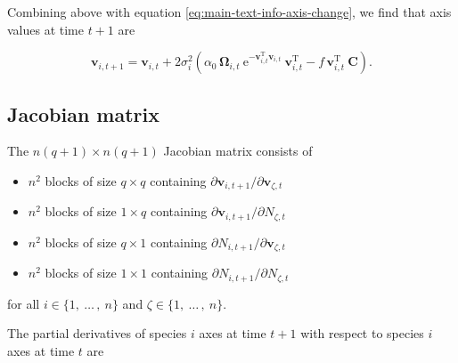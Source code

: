 Combining above with equation \ref{eq:main-text-info-axis-change}, we find that axis values at
time $t+1$ are

\begin{equation} \label{eq:supp-axis-change-full}
    \mathbf{v}_{i,t+1} = \mathbf{v}_{i,t} + 2 \sigma_i^2
    \left(
        \alpha_0 \, \mathbf{\Omega}_{i,t} \:
            \textrm{e}^{- \mathbf{v}_{i,t}^{\textrm{T}} \mathbf{v}_{i,t}} \:
            \mathbf{v}_{i,t}^{\textrm{T}}
        - f \, \mathbf{v}_{i,t}^{\textrm{T}} \: \mathbf{C}
    \right)
    \textrm{.}
\end{equation}


\subsection*{Jacobian matrix}

The $n(q+1) \times n(q+1)$ Jacobian matrix consists of 

\begin{itemize}
\item $n^2$ blocks of size $q \times q$ containing
    $\partial \mathbf{v}_{i,t+1} / \partial \mathbf{v}_{\zeta,t}$
\item $n^2$ blocks of size $1 \times q$ containing
    $\partial \mathbf{v}_{i,t+1} / \partial N_{\zeta,t}$
\item $n^2$ blocks of size $q \times 1$ containing
    $\partial N_{i,t+1} / \partial \mathbf{v}_{\zeta,t}$
\item $n^2$ blocks of size $1 \times 1$ containing
    $\partial N_{i,t+1} / \partial N_{\zeta,t}$
\end{itemize}


for all $i \in \{ 1, \: \ldots \, , \: n \}$
and $\zeta \in \{ 1, \: \ldots \, , \: n \}$.


The partial derivatives of species $i$ axes at time $t+1$ with respect
to species $i$ axes at time $t$ are

